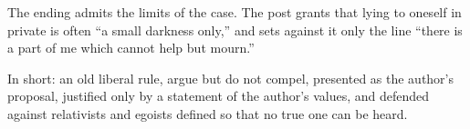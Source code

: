 \begin{afterword}
The ending admits the limits of the case. The post grants that lying to oneself in private is often ``a small darkness only,'' and sets against it only the line ``there is a part of me which cannot help but mourn.''

In short: an old liberal rule, argue but do not compel, presented as the author's proposal, justified only by a statement of the author's values, and defended against relativists and egoists defined so that no true one can be heard.
\end{afterword}
